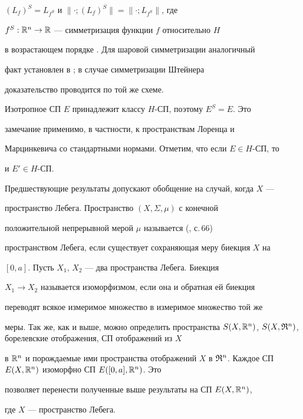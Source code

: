 $(L_f)^S=L_{f^S}$ и $\|\cdot;(L_f)^S\|=\|\cdot;L_{f^S}\|$, где 


$f^S:\Bbb R^n\to\Bbb R$ --- симметризация функции $f$ относительно $H$ 


в возрастающем порядке \cite{8}. Для шаровой симметризации аналогичный 


факт установлен в \cite{3}; в случае симметризации Штейнера 


доказательство проводится по той же схеме. 


 


Изотропное СП $E$ принадлежит классу $H$-СП, поэтому $E^S=E$. Это 


замечание применимо, в частности, к пространствам Лоренца и 


Марцинкевича со стандартными нормами. Отметим, что если $E\in H$-СП, то 


и $E'\in H$-СП. 


 


Предшествующие результаты допускают обобщение на случай, когда $X$ --- 


пространство Лебега. Пространство $(X,\Sigma,\mu)$ с конечной 


положительной непрерывной мерой $\mu$ называется (\cite{2}, с.\,66) 


пространством Лебега, если существует сохраняющая меру биекция $X$ на 


$[0,a]$. Пусть $X_1$, $X_2$ --- два пространства Лебега. Биекция 


$X_1\to X_2$ называется изоморфизмом, если она и обратная ей биекция 


переводят всякое измеримое множество в измеримое множество той же 


меры. Так же, как и выше, можно определить пространства $S(X,\Bbb 


R^n)$, $S(X,\frak R^n)$, борелевские отображения, СП отображений из $X$ 


в $\Bbb R^n$ и порождаемые ими пространства отображений $X$ в $\frak 


R^n$. Каждое СП $E(X,\Bbb R^n)$ изоморфно СП $E([0,a],\Bbb R^n)$. Это 


позволяет перенести полученные выше результаты на СП $E(X,\Bbb R^n)$,


где $X$ --- пространство Лебега. 


\medskip 


 


